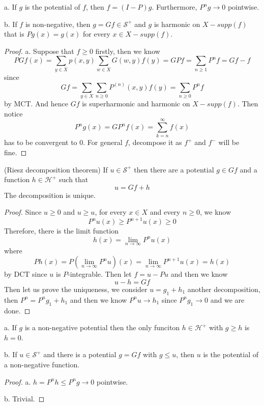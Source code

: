 \documentclass[lang=en,11pt,a4paper,citestyle =authoryear]{elegantpaper}
\newcommand{\Har}{\mathcal{H}}
\newcommand{\Sar}{\mathcal{S}}
\begin{document}
\begin{lemma}
    a. If $g$ is the potential of $f$, then $f = (I-P)g$. Furthermore, $P^ng\to 0$ pointwise.\par
    b. If $f$ is non-negative, then $g = Gf \in \Sar^+$ and $g$ is harmonic on $X- supp(f)$ that is $Pg(x) = g(x)$ for every $x\in X-supp(f)$.
\end{lemma}
\begin{proof}
    a. Suppose that $f \geq 0$ firstly, then we know
    \[
    P Gf(x) = \sum\limits_{y\in X}p(x,y)\sum\limits_{w\in X} G(w,y)f(y) = G Pf = \sum\limits_{n\geq 1}P^n f = Gf - f
    \]
    since
    \[
    Gf = \sum\limits_{y\in X}\sum_{n\geq 0}P^{(n)}(x,y)f(y) = \sum\limits_{n\geq 0}P^nf
    \]
    by MCT. And hence $Gf$ is superharmonic and harmonic on $X-supp(f)$. Then notice
    \[
    P^ng(x) = GP^nf(x) = \sum\limits_{k=n}^{\infty}f(x)
    \]
    has to be convergent to $0$. For general $f$, decompose it as $f^+$ and $f^-$ will be fine.
\end{proof}

\begin{theorem}
    (Riesz decomposition theorem) If $u\in \Sar^+$ then there are a potential $g\in Gf$ and a function $h\in\Har^+$ such that
    \[u = Gf + h\]
    The decomposition is unique.
\end{theorem}
\begin{proof}
    Since $u\geq 0$ and $u\geq u$, for every $x\in X$ and every $n\geq 0$, we know
    \[
    P^nu(x) \geq P^{n+1}u(x) \geq 0
    \]
    Therefore, there is the limit function
    \[
    h(x) = \lim_{n\to\infty} P^nu(x)
    \]
    where
    \[
    Ph(x) = P(\lim_{n\to\infty} P^n u)(x) = \lim_{n\to\infty}P^{n+1}u(x) = h(x)
    \]
    by DCT since $u$ is $P$-integrable. Then let $f = u - Pu$ and then we know
    \[
    u-h = Gf
    \]
    Then let us prove the uniqueness, we consider $u = g_1+h_1$ another decomposition, then $P^n = P^ng_1 + h_1$ and then we know $P^n u \to h_1$ since $P^ng_1 \to 0$ and we are done.
\end{proof}

\begin{corollary}
    a. If $g$ is a non-negative potential then the only funciton $h\in \Har^+$ with $g\geq h$ is $h = 0$.\par
    b. If $u \in \Sar^+$ and there is a potential $g = Gf$ with $g\leq u$, then $u$ is the potential of a non-negative function.
\end{corollary}
\begin{proof}
    a. $h = P^n h \leq P^ng \to 0$ pointwise.\par
    b. Trivial. 
\end{proof}
\end{document}
